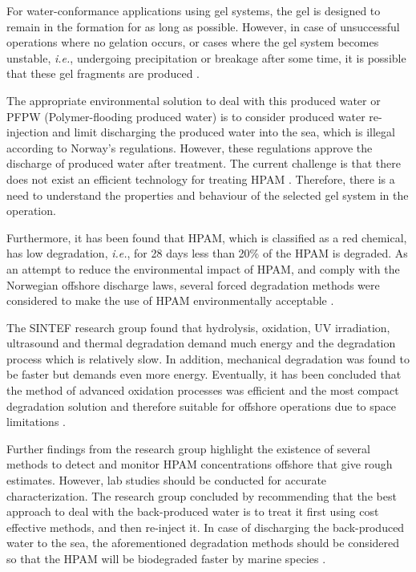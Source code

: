 For water-conformance applications using gel systems, the gel is designed to remain in the formation for as long as possible. However, in case of unsuccessful operations where no gelation occurs, or cases where the gel system becomes unstable, \textit{i.e.}, undergoing precipitation or breakage after some time, it is possible that these gel fragments are produced \citep{Force2012}.

The appropriate environmental solution to deal with this produced water or PFPW (Polymer-flooding produced water) is to consider produced water re-injection and limit discharging the produced water into the sea, which is illegal according to Norway’s regulations. However, these regulations approve the discharge of produced water after treatment. The current challenge is that there does not exist an efficient technology for treating HPAM \citep{Azrague2011}. Therefore, there is a need to understand the properties and behaviour of the selected gel system in the operation.

Furthermore, it has been found that HPAM, which is classified as a red chemical, has low degradation, \textit{i.e.}, for 28 days less than 20\% of the HPAM is degraded. As an attempt to reduce the environmental impact of HPAM, and comply with the Norwegian offshore discharge laws, several forced degradation methods were considered to make the use of HPAM environmentally acceptable \citep{Azrague2011}. 

The SINTEF research group found that hydrolysis, oxidation, UV irradiation, ultrasound and thermal degradation demand much energy and the degradation process which is relatively slow. In addition, mechanical degradation was found to be faster but demands even more energy. Eventually, it has been concluded that the method of advanced oxidation processes was efficient and the most compact degradation solution and therefore suitable for offshore operations due to space limitations \citep{Azrague2011}.

Further findings from the research group highlight the existence of several methods to detect and monitor HPAM concentrations offshore that give rough estimates. However, lab studies should be conducted for accurate characterization. The research group concluded by recommending that the best approach to deal with the back-produced water is to treat it first using cost effective methods, and then re-inject it. In case of discharging the back-produced water to the sea, the aforementioned degradation methods should be considered so that the HPAM will be biodegraded faster by marine species \citep{Azrague2011}.

